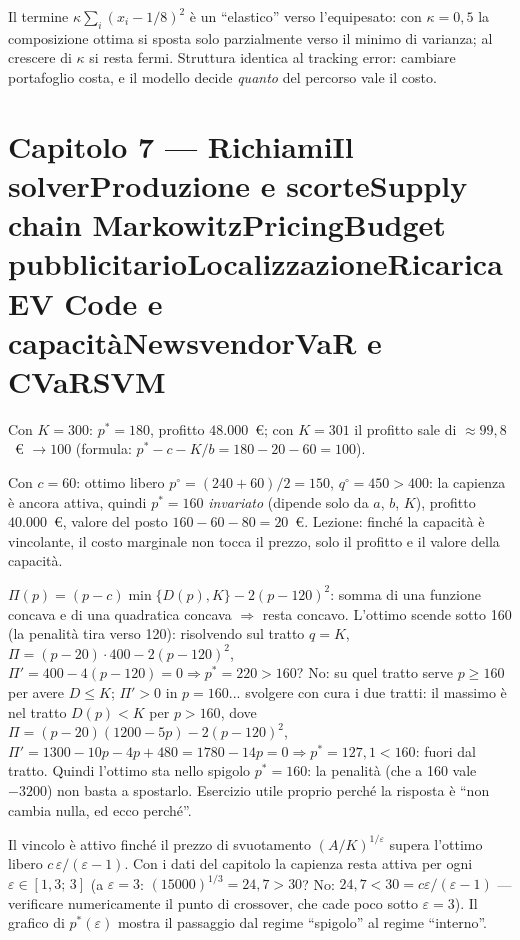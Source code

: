 \documentclass[11pt,a4paper]{article}
\newcounter{cap}
\newcounter{sol}[cap]
\newcommand{\capitolo}[1]{\setcounter{cap}{#1}\section*{Capitolo #1 --- \capnome{#1}}}
\newcommand{\capnome}[1]{%
  \ifcase#1\or\or Richiami\or Il solver\or Produzione e scorte\or Supply chain\or
  Markowitz\or Pricing\or Budget pubblicitario\or Localizzazione\or Ricarica EV\or
  Code e capacità\or Newsvendor\or VaR e CVaR\or SVM\fi}
\begin{document}
\begin{soluzione}
Il termine $\kappa\sum_i (x_i - 1/8)^2$ è un ``elastico'' verso l'equipesato: con
$\kappa = 0{,}5$ la composizione ottima si sposta solo parzialmente verso il minimo
di varianza; al crescere di $\kappa$ si resta fermi. Struttura identica al tracking
error: cambiare portafoglio costa, e il modello decide \emph{quanto} del percorso
vale il costo.
\end{soluzione}

\capitolo{7}

\begin{soluzione}[verifica]
Con $K = 300$: $p^* = 180$, profitto $48.000$~\euro; con $K = 301$ il profitto sale
di $\approx 99{,}8$~\euro{} $\to 100$ (formula: $p^* - c - K/b = 180 - 20 - 60 = 100$).
\end{soluzione}

\begin{soluzione}
Con $c = 60$: ottimo libero $p^\circ = (240 + 60)/2 = 150$, $q^\circ = 450 > 400$:
la capienza è ancora attiva, quindi $p^* = 160$ \emph{invariato} (dipende solo da $a$,
$b$, $K$), profitto $40.000$~\euro, valore del posto $160 - 60 - 80 = 20$~\euro.
Lezione: finché la capacità è vincolante, il costo marginale non tocca il prezzo,
solo il profitto e il valore della capacità.
\end{soluzione}

\begin{soluzione}
$\Pi(p) = (p - c)\min\{D(p), K\} - 2(p - 120)^2$: somma di una funzione concava e di
una quadratica concava $\Rightarrow$ resta concavo. L'ottimo scende sotto 160
(la penalità tira verso 120): risolvendo sul tratto $q = K$,
$\Pi = (p - 20) \cdot 400 - 2(p - 120)^2$, $\Pi' = 400 - 4(p - 120) = 0
\Rightarrow p^* = 220 > 160$? No: su quel tratto serve $p \ge 160$ per avere
$D \le K$; $\Pi' > 0$ in $p = 160$... svolgere con cura i due tratti: il massimo è nel
tratto $D(p) < K$ per $p > 160$, dove
$\Pi = (p-20)(1200-5p) - 2(p-120)^2$, $\Pi' = 1300 - 10p - 4p + 480 = 1780 - 14p = 0
\Rightarrow p^* = 127{,}1 < 160$: fuori dal tratto. Quindi l'ottimo sta nello spigolo
$p^* = 160$: la penalità (che a 160 vale $-3200$) non basta a spostarlo. Esercizio
utile proprio perché la risposta è ``non cambia nulla, ed ecco perché''.
\end{soluzione}

\begin{soluzione}[elasticità]
Il vincolo è attivo finché il prezzo di svuotamento $(A/K)^{1/\varepsilon}$ supera
l'ottimo libero $c\,\varepsilon/(\varepsilon - 1)$. Con i dati del capitolo la
capienza resta attiva per ogni $\varepsilon \in [1{,}3;\, 3]$ (a $\varepsilon = 3$:
$(15000)^{1/3} = 24{,}7 > 30$? No: $24{,}7 < 30 = c\varepsilon/(\varepsilon-1)$
--- verificare numericamente il punto di crossover, che cade poco sotto
$\varepsilon = 3$). Il grafico di $p^*(\varepsilon)$ mostra il passaggio dal regime
``spigolo'' al regime ``interno''.
\end{soluzione}
\end{document}
